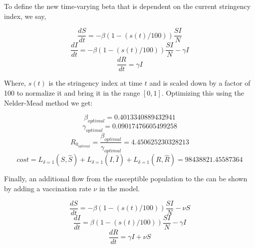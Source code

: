 \documentclass[tikz,fleqn,12pt]{wlscirep}
\begin{document}
To define the new time-varying beta that is dependent on the current stringency index, we say, 

\begin{equation}
  \frac{dS}{dt} = -\beta (1 - (s(t)/100)) \frac{S I}{N}
  \label{eq:S_with_lockdown}
\end{equation}
\begin{equation}
  \frac{dI}{dt} = -\beta (1 - (s(t)/100)) \frac{S I}{N} - \gamma I
  \label{eq:I_with_lockdown}
\end{equation}
\begin{equation}
  \frac{dR}{dt} = \gamma I
  \label{eq:R_with_lockdown}
\end{equation}

Where, $s(t)$ is the stringency index at time $t$ and is scaled down by a factor of 100 to normalize it and bring it in the range $[0, 1]$. Optimizing this using the Nelder-Mead method we get:

\begin{equation}
  \beta_{optimal} = 0.4013340889432941
  \label{eq:beta_optimal_with_lockdown}
\end{equation}
\begin{equation}
  \gamma_{optimal} = 0.09017476605499258
  \label{eq:gamma_optimal_with_lockdown}
\end{equation}
\begin{equation}
  R_{0_{optimal}} = \frac{\beta_{optimal}}{\gamma_{optimal}} = 4.450625230328213
  \label{eq:r0_with_lockdown}
\end{equation}
\begin{equation}
  cost = L_{\delta = 1}(S, \hat{S}) + L_{\delta = 1}(I, \hat{I}) + L_{\delta = 1}(R, \hat{R}) = 98438821.45587364
  \label{eq:cost_with_lockdown}
\end{equation}

Finally, an additional flow from the susceptible population to the can be shown by adding a vaccination rate $\nu$ in the model. 

\begin{equation}
  \frac{dS}{dt} = -\beta (1 - (s(t)/100)) \frac{S I}{N} - \nu S
  \label{eq:S_with_lockdown_and_nu}
\end{equation}
\begin{equation}
  \frac{dI}{dt} = \beta (1 - (s(t)/100)) \frac{S I}{N} - \gamma I
  \label{eq:I_with_lockdown_and_nu}
\end{equation}
\begin{equation}
  \frac{dR}{dt} = \gamma I + \nu S
  \label{eq:R_with_lockdown_and_nu}
\end{equation}
\end{document}
